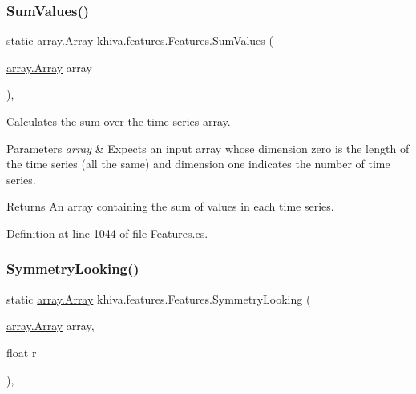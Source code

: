 \subsubsection{\texorpdfstring{Sum\+Values()}{SumValues()}}
{\footnotesize\ttfamily static \mbox{\hyperlink{classkhiva_1_1array_1_1_array}{array.\+Array}} khiva.\+features.\+Features.\+Sum\+Values (\begin{DoxyParamCaption}\item[{\mbox{\hyperlink{classkhiva_1_1array_1_1_array}{array.\+Array}}}]{array }\end{DoxyParamCaption})\hspace{0.3cm}{\ttfamily [inline]}, {\ttfamily [static]}}



Calculates the sum over the time series array. 


\begin{DoxyParams}{Parameters}
{\em array} & Expects an input array whose dimension zero is the length of the time series (all the same) and dimension one indicates the number of time series.\\
\hline
\end{DoxyParams}
\begin{DoxyReturn}{Returns}
An array containing the sum of values in each time series.
\end{DoxyReturn}


Definition at line 1044 of file Features.\+cs.

\mbox{\label{classkhiva_1_1features_1_1_features_aee05d0d4a8c61a95f8080a0ee9040739}} 
\subsubsection{\texorpdfstring{Symmetry\+Looking()}{SymmetryLooking()}}
{\footnotesize\ttfamily static \mbox{\hyperlink{classkhiva_1_1array_1_1_array}{array.\+Array}} khiva.\+features.\+Features.\+Symmetry\+Looking (\begin{DoxyParamCaption}\item[{\mbox{\hyperlink{classkhiva_1_1array_1_1_array}{array.\+Array}}}]{array,  }\item[{float}]{r }\end{DoxyParamCaption})\hspace{0.3cm}{\ttfamily [inline]}, {\ttfamily [static]}}




